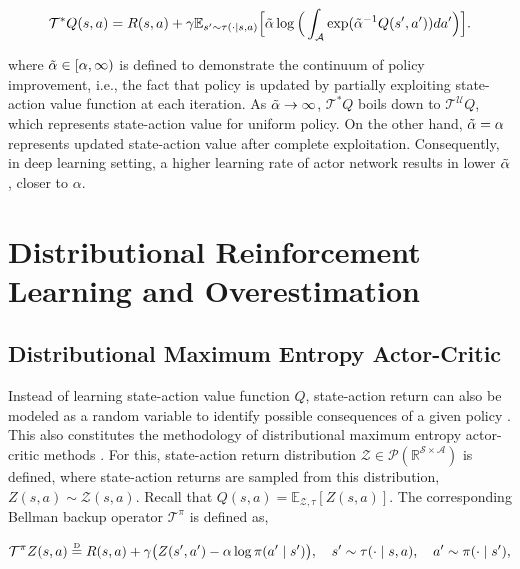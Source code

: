 \documentclass{article}
\newcommand\disteq{\mathrel{\stackrel{\makebox[0pt]{\mbox{\normalfont\tiny D}}}{=}}}
\begin{document}
\begin{equation}
	\label{eqn:q_optimal}
	\mathcal{T}^{*} Q(s,a) = R(s,a) + \gamma \mathbb{E}_{s'\sim\tau(\cdot \mid s,a)} \Big[ \Tilde{\alpha} \log \Big( \int_{\mathcal{A}} \exp({\Tilde{\alpha}}^{-1} {Q}(s',a')) da' \Big) \Big]. 
\end{equation}

where $\Tilde{\alpha} \in [ \alpha, \infty ) $ is defined to demonstrate the continuum of policy improvement, i.e., the fact that policy is updated by partially exploiting state-action value function at each iteration. As $\Tilde{\alpha} \rightarrow \infty$, $\mathcal{T}^{*}Q$ boils down to $\mathcal{T}^{\mathcal{U}}Q$, which represents state-action value for uniform policy. On the other hand, $\Tilde{\alpha} = \alpha$ represents updated state-action value after complete exploitation. Consequently, in deep learning setting, a higher learning rate of actor network results in lower $\Tilde{\alpha}$, closer to $\alpha$. 

\section{Distributional Reinforcement Learning and Overestimation}

\subsection{Distributional Maximum Entropy Actor-Critic}
Instead of learning state-action value function $Q$, state-action return can also be modeled as a random variable to identify possible consequences of a given policy \citep{bellemare2017distributional}. This also constitutes the methodology of distributional maximum entropy actor-critic methods \citep{duan2021distributional, ma2025dsac}. For this, state-action return distribution  $\mathcal{Z}\in\mathcal{P}(\mathbb{R}^{\mathcal{S}\times\mathcal{A}})$ is defined, where state-action returns are sampled from this distribution, $Z(s, a) \sim \mathcal{Z}(s, a)$. Recall that $Q(s,a) = \mathbb{E}_{\mathcal{Z}, \tau} [ Z(s,a) ]$. The corresponding Bellman backup operator $\mathcal{T}^{\pi}$ is defined as, 

\begin{equation}
	\label{eqn:z_eval}
	\mathcal{T}^{\pi} Z(s,a) \disteq R(s,a) + \gamma \big( Z(s',a') - \alpha \log \pi(a' \mid s') \big), \quad s'\sim\tau(\cdot \mid s,a), \quad a' \sim \pi(\cdot \mid s'), 
\end{equation}
\end{document}
